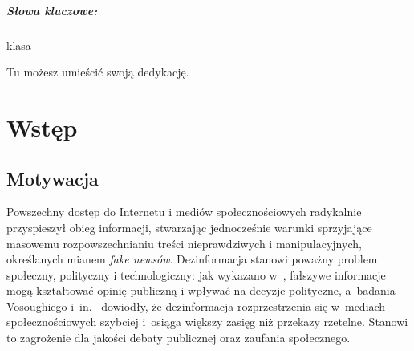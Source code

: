 \documentclass[oneside,polski,logo]{amuthesis}
\date{Poznań, czerwiec 2026}
\begin{document}
\maketitle
\makestatement

\begin{streszczenie}
\lipsum[1]

\paragraph{Słowa kluczowe:} klasa
\end{streszczenie}

\begin{abstract}
\lipsum[2]

\paragraph{Keywords:} klasa
\end{abstract}

\begin{dedykacja}
Tu możesz umieścić swoją dedykację.
\end{dedykacja}

\tableofcontents


\chapter{Wstęp}

\section{Motywacja}
Powszechny dostęp do Internetu i mediów społecznościowych radykalnie przyspieszył obieg informacji, stwarzając jednocześnie warunki sprzyjające masowemu rozpowszechnianiu treści nieprawdziwych i manipulacyjnych, określanych mianem \textit{fake newsów}. Dezinformacja stanowi poważny problem społeczny, polityczny i technologiczny: jak wykazano w~\cite{Shu2017}, fałszywe informacje mogą kształtować opinię publiczną i wpływać na decyzje polityczne, a~badania Vosoughiego i~in.\ \cite{vosoughi2018spread} dowiodły, że dezinformacja rozprzestrzenia się w~mediach społecznościowych szybciej i~osiąga większy zasięg niż przekazy rzetelne. Stanowi to zagrożenie dla jakości debaty publicznej oraz zaufania społecznego.
\end{document}
